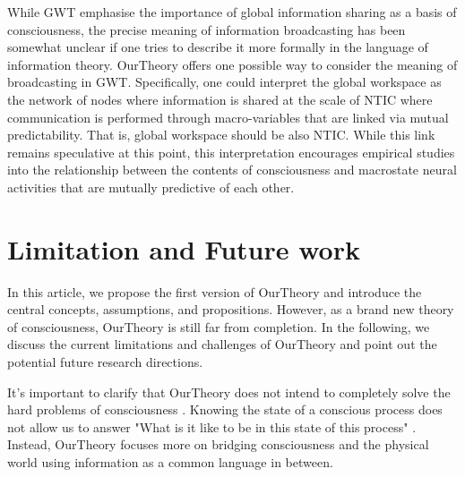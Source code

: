 \documentclass[utf8]{article}
\begin{document}
        While GWT emphasise the importance of global information sharing as a basis of consciousness, the precise meaning of information broadcasting has been somewhat unclear if one tries to describe it more formally in the language of information theory. \ac{OurTheory} offers one possible way to consider the meaning of broadcasting in GWT. Specifically, one could interpret the global workspace as the network of nodes where information is shared at the scale of NTIC where communication is performed through macro-variables that are linked via mutual predictability. That is, global workspace should be also NTIC. While this link remains speculative at this point, this interpretation encourages empirical studies into the relationship between the contents of consciousness and macrostate neural activities that are mutually predictive of each other. 
		

    \section{Limitation and Future work}\label{sec:Limitation and Future work}  
        In this article, we propose the first version of \ac{OurTheory} and introduce the central concepts, assumptions, and propositions. However, as a brand new theory of consciousness, \ac{OurTheory} is still far from completion. In the following, we discuss the current limitations and challenges of \ac{OurTheory} and point out the potential future research directions.
    
        
        It's important to clarify that \ac{OurTheory} does not intend to completely solve the hard problems of consciousness \citep{chalmers1995facing}. Knowing the state of a conscious process does not allow us to answer "What is it like to be in this state of this process" \citep{nagel1974like}. Instead, \ac{OurTheory} focuses more on bridging consciousness and the physical world using information as a common language in between. %
        
\end{document}

